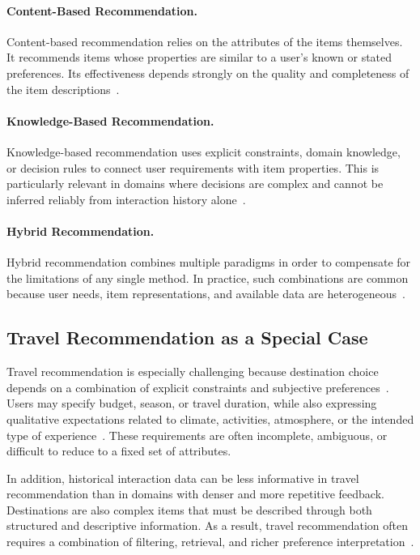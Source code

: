 \paragraph{Content-Based Recommendation.}
Content-based recommendation relies on the attributes of the items themselves. It recommends items whose properties are similar to a user's known or stated preferences. Its effectiveness depends strongly on the quality and completeness of the item descriptions~\parencite{adomaviciusTuzhilinNextGeneration}.

\paragraph{Knowledge-Based Recommendation.}
Knowledge-based recommendation uses explicit constraints, domain knowledge, or decision rules to connect user requirements with item properties. This is particularly relevant in domains where decisions are complex and cannot be inferred reliably from interaction history alone~\parencite{adomaviciusTuzhilinNextGeneration}.

\paragraph{Hybrid Recommendation.}
Hybrid recommendation combines multiple paradigms in order to compensate for the limitations of any single method. In practice, such combinations are common because user needs, item representations, and available data are heterogeneous~\parencite{burkeHybridSurvey}.

\subsection{Travel Recommendation as a Special Case}
Travel recommendation is especially challenging because destination choice depends on a combination of explicit constraints and subjective preferences~\parencite{dietzDestinationCharacterization}. Users may specify budget, season, or travel duration, while also expressing qualitative expectations related to climate, activities, atmosphere, or the intended type of experience~\parencite{aleneziTravelPersonality}. These requirements are often incomplete, ambiguous, or difficult to reduce to a fixed set of attributes.

In addition, historical interaction data can be less informative in travel recommendation than in domains with denser and more repetitive feedback. Destinations are also complex items that must be described through both structured and descriptive information. As a result, travel recommendation often requires a combination of filtering, retrieval, and richer preference interpretation~\parencite{dietzDestinationCharacterization}.

